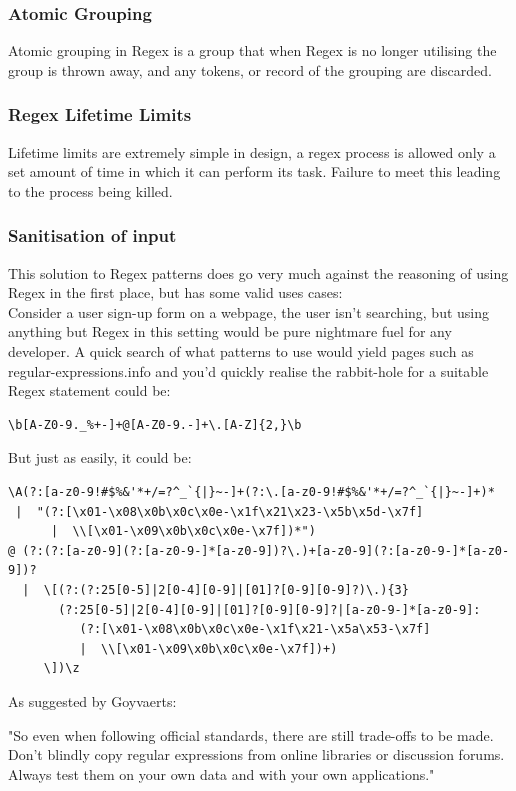 \documentclass{IEEEtran}
\begin{document}
            \subsubsection{Atomic Grouping}
                Atomic grouping in Regex is a group that when Regex is no longer utilising 
                the group is thrown away, and any tokens, or record of the grouping are discarded.
            \subsubsection{Regex Lifetime Limits}
                Lifetime limits are extremely simple in design, a regex process is allowed only 
                a set amount of time in which it can perform its task. Failure to meet this 
                leading to the process being killed.
            \subsubsection{Sanitisation of input}
                This solution to Regex patterns does go very much against the reasoning of 
                using Regex in the first place, but has some valid uses cases:\\
                Consider a user sign-up form on a webpage, the user isn't searching, but 
                using anything but Regex in this setting would be pure nightmare fuel for 
                any developer. A quick search of what patterns to use would yield pages such as
                regular-expressions.info\cite{RegularExpressions.info} and you'd quickly realise
                the rabbit-hole for a suitable Regex statement could be:

                \begin{verbatim}
\b[A-Z0-9._%+-]+@[A-Z0-9.-]+\.[A-Z]{2,}\b
                \end{verbatim}

                But just as easily, it could be: 

                \begin{verbatim}
\A(?:[a-z0-9!#$%&'*+/=?^_`{|}~-]+(?:\.[a-z0-9!#$%&'*+/=?^_`{|}~-]+)*
 |  "(?:[\x01-\x08\x0b\x0c\x0e-\x1f\x21\x23-\x5b\x5d-\x7f]
      |  \\[\x01-\x09\x0b\x0c\x0e-\x7f])*")
@ (?:(?:[a-z0-9](?:[a-z0-9-]*[a-z0-9])?\.)+[a-z0-9](?:[a-z0-9-]*[a-z0-9])?
  |  \[(?:(?:25[0-5]|2[0-4][0-9]|[01]?[0-9][0-9]?)\.){3}
       (?:25[0-5]|2[0-4][0-9]|[01]?[0-9][0-9]?|[a-z0-9-]*[a-z0-9]:
          (?:[\x01-\x08\x0b\x0c\x0e-\x1f\x21-\x5a\x53-\x7f]
          |  \\[\x01-\x09\x0b\x0c\x0e-\x7f])+)
     \])\z
                \end{verbatim}
                As suggested by Goyvaerts\cite{RegularExpressions.info}:
                \begin{displayquote}
                    "So even when following official standards, there are still trade-offs to be made. Don't blindly copy regular expressions from online libraries or discussion forums. Always test them on your own data and with your own applications."
                \end{displayquote}
\end{document}
